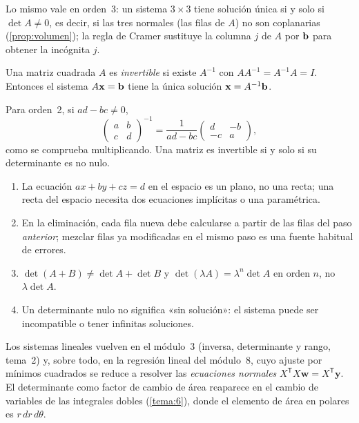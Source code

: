 Lo mismo vale en orden~3: un sistema $3\times3$ tiene solución única si y solo si $\det A\neq0$, es decir, si las tres normales (las filas de $A$) no son coplanarias (\cref{prop:volumen}); la regla de Cramer sustituye la columna $j$ de $A$ por $\mathbf{b}$ para obtener la incógnita $j$.

\begin{definicion}\label{def:inversa}
Una matriz cuadrada $A$ es \emph{invertible} si existe $A^{-1}$ con $AA^{-1}=A^{-1}A=I$. Entonces el sistema $A\mathbf{x}=\mathbf{b}$ tiene la única solución $\mathbf{x}=A^{-1}\mathbf{b}$.
\end{definicion}

Para orden~2, si $ad-bc\neq0$,
\begin{equation}\label{eq:t2-inversa}
\begin{pmatrix}a&b\\c&d\end{pmatrix}^{-1}=\frac{1}{ad-bc}\begin{pmatrix}d&-b\\-c&a\end{pmatrix},
\end{equation}
como se comprueba multiplicando. Una matriz es invertible si y solo si su determinante es no nulo.

\begin{observacion}
\begin{enumerate}[label=(\alph*)]
\item La ecuación $ax+by+cz=d$ en el espacio es un plano, no una recta; una recta del espacio necesita dos ecuaciones implícitas o una paramétrica.
\item En la eliminación, cada fila nueva debe calcularse a partir de las filas del paso \emph{anterior}; mezclar filas ya modificadas en el mismo paso es una fuente habitual de errores.
\item $\det(A+B)\neq\det A+\det B$ y $\det(\lambda A)=\lambda^n\det A$ en orden $n$, no $\lambda\det A$.
\item Un determinante nulo no significa «sin solución»: el sistema puede ser incompatible o tener infinitas soluciones.
\end{enumerate}
\end{observacion}

\begin{observacion}
Los sistemas lineales vuelven en el módulo~3 (inversa, determinante y rango, tema~2) y, sobre todo, en la regresión lineal del módulo~8, cuyo ajuste por mínimos cuadrados se reduce a resolver las \emph{ecuaciones normales} $X^{\mathsf T}X\mathbf w=X^{\mathsf T}\mathbf y$. El determinante como factor de cambio de área reaparece en el cambio de variables de las integrales dobles (\cref{tema:6}), donde el elemento de área en polares es $r\,dr\,d\theta$.
\end{observacion}

